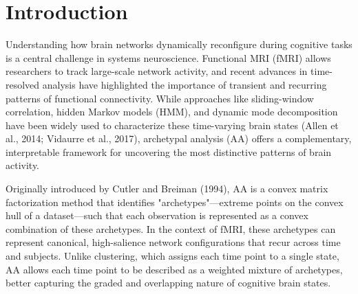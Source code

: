 \documentclass[12pt]{article}
\begin{document}






\section*{Introduction}
Understanding how brain networks dynamically reconfigure during cognitive tasks is a central challenge in systems neuroscience. Functional MRI (fMRI) allows researchers to track large-scale network activity, and recent advances in time-resolved analysis have highlighted the importance of transient and recurring patterns of functional connectivity. While approaches like sliding-window correlation, hidden Markov models (HMM), and dynamic mode decomposition have been widely used to characterize these time-varying brain states (Allen et al., 2014; Vidaurre et al., 2017), archetypal analysis (AA) offers a complementary, interpretable framework for uncovering the most distinctive patterns of brain activity.

Originally introduced by Cutler and Breiman (1994), AA is a convex matrix factorization method that identifies "archetypes"—extreme points on the convex hull of a dataset—such that each observation is represented as a convex combination of these archetypes. In the context of fMRI, these archetypes can represent canonical, high-salience network configurations that recur across time and subjects. Unlike clustering, which assigns each time point to a single state, AA allows each time point to be described as a weighted mixture of archetypes, better capturing the graded and overlapping nature of cognitive brain states.
\end{document}
